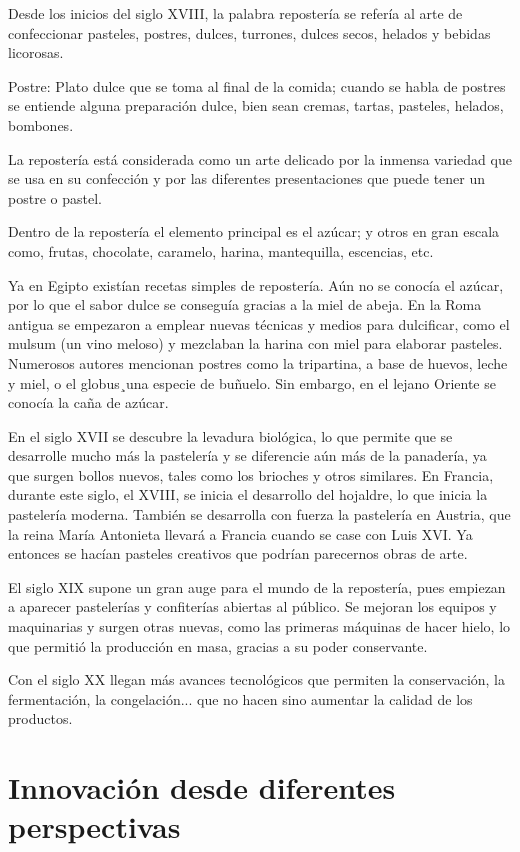 \documentclass{bmcart}
\begin{document}
Desde los inicios del siglo XVIII, la palabra repostería se refería al arte de confeccionar pasteles, postres, dulces, turrones, dulces secos, helados y bebidas licorosas.


Postre: Plato dulce que se toma al final de la comida; cuando se habla de postres se entiende alguna preparación dulce, bien sean cremas, tartas, pasteles, helados, bombones.

La repostería está considerada como un arte delicado por la inmensa variedad que se usa en su confección y por las diferentes presentaciones que puede tener un postre o pastel.

Dentro de la repostería el elemento principal es el azúcar; y otros en gran escala como, frutas, chocolate, caramelo, harina, mantequilla, escencias, etc.

Ya en Egipto existían recetas simples de repostería. Aún no se conocía el azúcar, por lo que el sabor dulce se conseguía gracias a la miel de abeja.
En la Roma antigua se empezaron a emplear nuevas técnicas y medios para dulcificar, como el mulsum (un vino meloso) y mezclaban la harina con miel para elaborar pasteles. Numerosos autores mencionan postres como la tripartina, a base de huevos, leche y miel, o el globus¸una especie de buñuelo. Sin embargo, en el lejano Oriente se conocía la caña de azúcar. 

En el siglo XVII se descubre la levadura biológica, lo que permite que se desarrolle mucho más la pastelería y se diferencie aún más de la panadería, ya que surgen bollos nuevos, tales como los brioches y otros similares.
En Francia, durante este siglo, el XVIII, se inicia el desarrollo del hojaldre, lo que inicia la pastelería moderna. También se desarrolla con fuerza la pastelería en Austria, que la reina María Antonieta llevará a Francia cuando se case con Luis XVI. Ya entonces se hacían pasteles creativos que podrían parecernos obras de arte. 

El siglo XIX supone un gran auge para el mundo de la repostería, pues empiezan a aparecer pastelerías y confiterías abiertas al público. Se mejoran los equipos y maquinarias y surgen otras nuevas, como las primeras máquinas de hacer hielo, lo que permitió la producción en masa, gracias a su poder conservante.

Con el siglo XX llegan más avances tecnológicos que permiten la conservación, la fermentación, la congelación... que no hacen sino aumentar la calidad de los productos.

\section{Innovación desde diferentes perspectivas}
\end{document}
